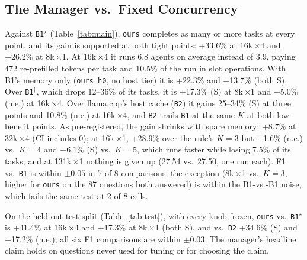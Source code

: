\documentclass[conference]{IEEEtran}
\newcommand{\K}{$K$}
\newcommand{\x}{$\times$}
\newcommand{\pick}{$^\star$}
\newcommand{\topk}{$^\dagger$}
\newcommand{\cfg}[1]{\texttt{#1}}
\begin{document}
\subsection{The Manager vs.\ Fixed Concurrency}\label{sec:main}
Against \cfg{B1}\pick{} (Table~\ref{tab:main}), \cfg{ours} completes as many or more tasks at every
point, and its gain is supported at both tight points: +33.6\% at 16k\,\x4 and +26.2\% at 8k\,\x1. At
16k\,\x4 it runs 6.8 agents on average instead of 3.9, paying 472 re-prefilled tokens per task and
10.5\% of the run in slot operations. With B1's memory only (\cfg{ours\_h0}, no host tier) it is
+22.3\% and +13.7\% (both S). Over \cfg{B1}\topk, which drops 12--36\% of its tasks, it is +17.3\% (S) at
8k\,\x1 and +5.0\% (n.e.) at 16k\,\x4. Over llama.cpp's host cache (\cfg{B2}) it gains 25--34\% (S) at
three points and 10.8\% (n.e.) at 16k\,\x4, and \cfg{B2} trails \cfg{B1} at the same \K{} at both
low-benefit points. As
pre-registered, the gain shrinks with spare memory: +8.7\% at 32k\,\x4 (CI includes 0); at 16k\,\x1,
+28.9\% over the rule's $K{=}3$ but +1.6\% (n.e.) vs.\ $K{=}4$ and $-6.1\%$ (S) vs.\ $K{=}5$, which runs
faster while losing 7.5\% of its tasks; and at 131k\,\x1 nothing is given up (27.54 vs.\ 27.50, one
run each). F1 vs.\ \cfg{B1} is within $\pm0.05$ in 7 of 8 comparisons; the exception (8k\,\x1 vs.\
$K{=}3$, higher for \cfg{ours} on the 87 questions both answered) is within the B1-vs.-B1 noise, which
fails the same test at 2 of 8 cells.

On the held-out test split (Table~\ref{tab:test}), with every knob frozen, \cfg{ours} vs.\
\cfg{B1}\pick{} is +41.4\% at 16k\,\x4 and +17.3\% at 8k\,\x1 (both S), and vs.\ \cfg{B2} +34.6\% (S)
and +17.2\% (n.e.); all six F1 comparisons are within $\pm0.03$. The manager's headline claim holds on
questions never used for tuning or for choosing the claim.
\end{document}
